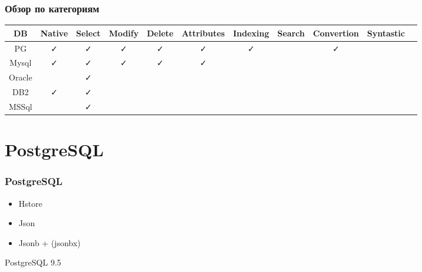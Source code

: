 \documentclass[14pt, compress, aspectratio=169]{beamer}
\def\check{\textcolor{check}{\FA \faCheck}}
\def\fail{\textcolor{fail}{\FA \faRemove}}
\def\question{\textcolor{question}{\FA \faSearch}}
\begin{document}
\begin{frame}[fragile]
    \frametitle{Обзор по категориям}

    \begin{adjustbox}{max totalsize={1.1\textwidth}{2.0\textheight},center}
        \begin{tabular}{c | c | c | c | c | c | c | c | c | c | c}
            DB & Native & Select & Modify & Delete & Attributes & Indexing & Search & Convertion & Syntastic \\
            \hline
            PG & \check & \check & \check & \check & \check & \check & \question & \check & \question \\
            Mysql & \check & \check & \check & \check & \check & \question & \question & \fail & \question \\
            Oracle & \fail & \check & \fail & \fail & \fail & \fail & \question & \question & \question \\
            DB2 & \check & \check & \fail & \fail & \fail & \fail & \fail & \question & \fail \\
            MSSql & \fail & \check & \fail & \fail & \fail & \fail & \question & \question & \fail \\
        \end{tabular}
    \end{adjustbox}
\end{frame}

\section{PostgreSQL}

\begin{frame}[fragile]
    \frametitle{PostgreSQL}
    \begin{itemize}[label={\MVRightarrow}]
        \item Hstore
        \item Json
        \item \alert{Jsonb + (jsonbx)}
    \end{itemize}

    PostgreSQL 9.5
\end{frame}
    
\end{document}
